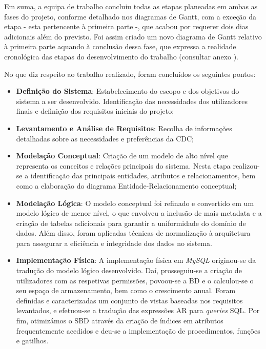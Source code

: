 \documentclass[a4paper,12pt]{scrreprt}
\begin{document}
    Em suma, a equipa de trabalho concluiu todas as etapas planeadas em ambas as fases do projeto, conforme detalhado nos diagramas de Gantt, com a exceção da etapa \textit{} - esta pertencente à primeira parte -, que acabou por requerer dois dias adicionais além do previsto. Foi assim criado um novo diagrama de Gantt relativo à primeira parte aquando à conclusão dessa fase, que expressa a realidade cronológica das etapas do desenvolvimento do trabalho (consultar anexo \textit{}).

    No que diz respeito ao trabalho realizado, foram concluídos os seguintes pontos:
    \begin{itemize}
        \item \textbf{Definição do Sistema}: Estabelecimento do escopo e dos objetivos do sistema a ser desenvolvido. Identificação das necessidades dos utilizadores finais e definição dos requisitos iniciais do projeto;
        \item \textbf{Levantamento e Análise de Requisitos}: Recolha de informações detalhadas sobre as necessidades e preferências da CDC;
        \item \textbf{Modelação Conceptual}: Criação de um modelo de alto nível que representa os conceitos e relações principais do sistema. Nesta etapa realizou-se a identificação das principais entidades, atributos e relacionamentos, bem como a elaboração do diagrama
        Entidade-Relacionamento conceptual;
        \item \textbf{Modelação Lógica}: O modelo conceptual foi refinado e convertido em um modelo lógico de menor nível, o que envolveu a inclusão de mais metadata e a criação de tabelas adicionais para garantir a uniformidade do domínio de dados. Além disso, foram aplicadas técnicas de normalização à arquitetura para assegurar a eficiência e integridade dos dados no sistema.
        \item \textbf{Implementação Física}: A implementação física em \textit{MySQL} originou-se da tradução do modelo lógico desenvolvido. Daí, prosseguiu-se a criação de utilizadores com as respetivas permissões, povoou-se a BD e o calculou-se o seu espaço de armazenamento, bem como o crescimento anual. Foram definidas e caracterizadas um conjunto de vistas baseadas nos requisitos levantados, e efetuou-se a tradução das expressões AR para \textit{queries} SQL. Por fim, otimizámos o SBD através da criação de índices em atributos frequentemente acedidos e deu-se a implementação de procedimentos, funções e gatilhos.
        
    \end{itemize}
\end{document}
